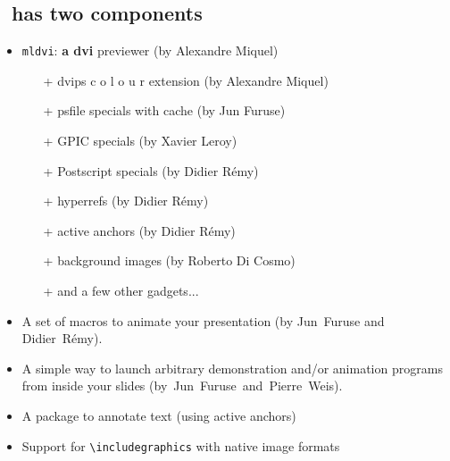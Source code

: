 \documentclass[12pt]{article}
\begin{document}
\newpage

\subsection* {\ActiveDVI~has two components}

\begin{itemize}
\item {\tt mldvi}: {\bf a dvi} previewer (by Alexandre Miquel)
\begin {itemize}
\item[+] dvips
  \textcolor{c1}{c}%
  \textcolor{c2}{o}%
  \textcolor{c3}{l}%
  \textcolor{c4}{o}%
  \textcolor{c5}{u}%
  \textcolor{c6}{r}
  extension (by Alexandre Miquel)
\item[+] psfile specials with cache (by Jun Furuse)
\item[+] GPIC specials (by Xavier Leroy)
\item[+] Postscript specials (by Didier R{\'{e}}my)
\item[+] hyperrefs (by Didier R{\'{e}}my)
\item[+] active anchors (by Didier R{\'{e}}my)
\item[+] background images (by Roberto Di Cosmo)
\item[+] and a few other gadgets...
\end {itemize}
\end{itemize}

\begin{itemize}
\item 
A set of macros to animate your presentation 
(by Jun~Furuse and Didier~R{\'{e}}my).
 
\item 
A simple way to launch arbitrary demonstration and/or animation
programs from inside your slides
\hbox {(by Jun Furuse and Pierre Weis)}.

\item 
A package to annotate text (using active anchors)

\item
Support for \verb+\includegraphics+ with native image formats

\end{itemize}

\newpage

\def \flash #1{\let \do\leflash \do #1\relax}
\def \leflash #1{\ifx #1\relax \def \do{}\else \def \do {#1\adviwait[0.05]\leflash}\fi \do}

\def\goon{\hbox{{\Large $\Rightarrow$}~Type~space~to~go~on}}
\end{document}
